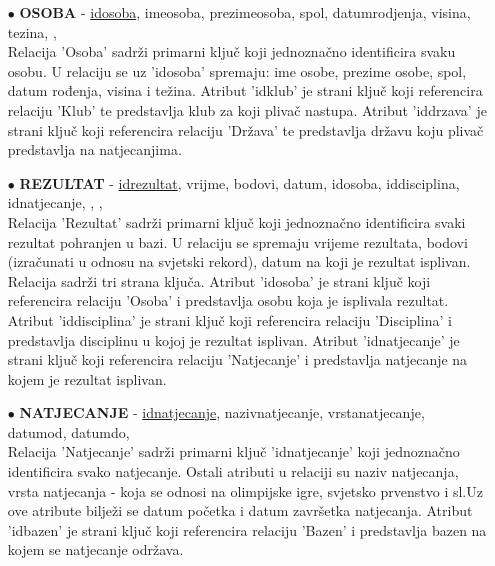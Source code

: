\documentclass[times, utf8, zavrsni]{fer}
\begin{document}
\begin{itemize}
    \item[$\bullet$] \textbf{OSOBA} - \underline{idosoba}, imeosoba, prezimeosoba, spol, datumrodjenja, visina, tezina, 
    ,  \\
    Relacija 'Osoba' sadrži primarni ključ koji jednoznačno identificira svaku osobu. U relaciju se uz 'idosoba' spremaju: ime osobe, prezime osobe,
    spol, datum rođenja, visina i težina. Atribut 'idklub' je strani ključ koji referencira relaciju 'Klub' te predstavlja klub za koji plivač nastupa.
    Atribut 'iddrzava' je strani ključ koji referencira relaciju 'Država' te predstavlja državu koju plivač predstavlja na natjecanjima.
    
\vspace{\baselineskip}

    \item[$\bullet$] \textbf{REZULTAT} - \underline{idrezultat}, vrijme, bodovi, datum, idosoba, iddisciplina, idnatjecanje,
    , ,  \\
    Relacija 'Rezultat' sadrži primarni ključ koji jednoznačno identificira svaki rezultat pohranjen u bazi. U relaciju se spremaju vrijeme rezultata, 
    bodovi (izračunati u odnosu na svjetski rekord), datum na koji je rezultat isplivan. Relacija sadrži tri strana ključa. Atribut 'idosoba' je strani ključ
    koji referencira relaciju 'Osoba' i predstavlja osobu koja je isplivala rezultat. Atribut 'iddisciplina' je strani ključ
    koji referencira relaciju 'Disciplina' i predstavlja disciplinu u kojoj je rezultat isplivan. Atribut 'idnatjecanje' je strani ključ
    koji referencira relaciju 'Natjecanje' i predstavlja natjecanje na kojem je rezultat isplivan.

\vspace{\baselineskip}

    \item[$\bullet$] \textbf{NATJECANJE} - \underline{idnatjecanje}, nazivnatjecanje, vrstanatjecanje, datumod, datumdo,  \\
    Relacija 'Natjecanje' sadrži primarni ključ 'idnatjecanje' koji jednoznačno identificira svako natjecanje. Ostali atributi u relaciji su naziv natjecanja, 
    vrsta natjecanja - koja se odnosi na olimpijske igre, svjetsko prvenstvo i sl.Uz ove atribute bilježi se datum početka i datum završetka natjecanja.
    Atribut 'idbazen' je strani ključ koji referencira relaciju 'Bazen' i predstavlja bazen na kojem se natjecanje održava.


\end{itemize}
\end{document}

